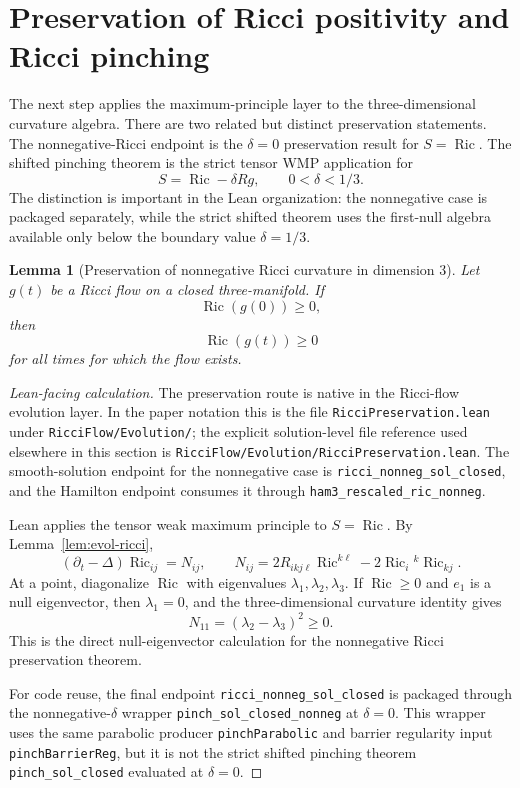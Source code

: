 \documentclass[11pt]{article}
\theoremstyle{plain}
\newtheorem{lemma}[theorem]{Lemma}
\theoremstyle{definition}
\theoremstyle{remark}
\newcommand{\Ric}{\operatorname{Ric}}
\newcommand{\leanref}[1]{\nolinkurl{#1}}
\newcommand{\leanfile}[1]{\nolinkurl{#1}}
\newcommand{\rffile}[1]{\leanfile{#1}}
\newcommand{\rfdir}[1]{\leanfile{#1/}}
\begin{document}
\section{Preservation of Ricci positivity and Ricci pinching}

The next step applies the maximum-principle layer to the three-dimensional
curvature algebra.  There are two related but distinct preservation statements.
The nonnegative-Ricci endpoint is the \(\delta=0\) preservation result for
\(S=\Ric\).  The shifted pinching theorem is the strict tensor WMP application
for
\[
  S=\Ric-\delta Rg,\qquad 0<\delta<1/3.
\]
The distinction is important in the Lean organization: the nonnegative case is
packaged separately, while the strict shifted theorem uses the first-null
algebra available only below the boundary value \(\delta=1/3\).

\begin{lemma}[Preservation of nonnegative Ricci curvature in dimension $3$]
\label{lem:preserve-ricci-nonnegative}
Let $g(t)$ be a Ricci flow on a closed three-manifold. If
\[
\Ric(g(0))\ge0,
\]
then
\[
\Ric(g(t))\ge0
\]
for all times for which the flow exists.
\end{lemma}

\begin{proof}[Lean-facing calculation]
The preservation route is native in the Ricci-flow evolution layer.  In the
paper notation this is the file \rffile{RicciPreservation.lean} under
\rfdir{RicciFlow/Evolution}; the explicit solution-level file reference used
elsewhere in this section is \rffile{RicciFlow/Evolution/RicciPreservation.lean}.
The smooth-solution endpoint for the nonnegative case is
\leanref{ricci_nonneg_sol_closed}, and the Hamilton endpoint consumes it through
\leanref{ham3_rescaled_ric_nonneg}.

Lean applies the tensor weak maximum principle to \(S=\Ric\).  By
Lemma~\ref{lem:evol-ricci},
\[
(\partial_t-\Delta)\Ric_{ij}=N_{ij},
\qquad
N_{ij}=2R_{ikj\ell}\Ric^{k\ell}-2\Ric_i{}^k\Ric_{kj}.
\]
At a point, diagonalize \(\Ric\) with eigenvalues
\(\lambda_1,\lambda_2,\lambda_3\).  If \(\Ric\ge0\) and \(e_1\) is a null
eigenvector, then \(\lambda_1=0\), and the three-dimensional curvature
identity gives
\[
N_{11}=(\lambda_2-\lambda_3)^2\ge0.
\]
This is the direct null-eigenvector calculation for the nonnegative Ricci
preservation theorem.

For code reuse, the final endpoint \leanref{ricci_nonneg_sol_closed} is
packaged through the nonnegative-\(\delta\) wrapper
\leanref{pinch_sol_closed_nonneg} at \(\delta=0\).  This wrapper uses the same
parabolic producer \leanref{pinchParabolic} and barrier regularity input
\leanref{pinchBarrierReg}, but it is not the strict shifted pinching theorem
\leanref{pinch_sol_closed} evaluated at \(\delta=0\).
\end{proof}
\end{document}
